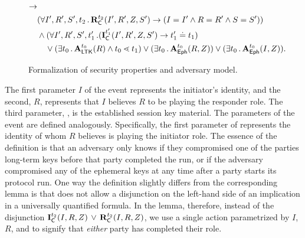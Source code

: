\begin{figure*}
\begin{align*}
    \rightarrow\\
      &(\forall I', R', S', t_2\operatorname{.} \mathbf{R}_{\textsf{C}}^{t_2}(I', R', Z, S') \rightarrow
             (I=I' \land R=R' \land S=S'))\\
      &\land (\forall I', R', S', t_1'\operatorname{.}
        (\mathbf{I}_{\textsf{C}}^{t_1'}(I', R', Z, S') \rightarrow t_1' \doteq t_1
        )\\
      &\ \ \ \lor(\exists t_0\operatorname{.} \mathbf{A}_{\textsf{LTK}}^{t_0}(R) \land t_0 \lessdot t_1)
    \lor(\exists t_0\operatorname{.} \mathbf{A}_{\textsf{Eph}}^{t_0}(R, Z))
    \lor(\exists t_0\operatorname{.} \mathbf{A}_{\textsf{Eph}}^{t_0}(I, Z)).
\end{align*}
%
\caption{Formalization of security properties and adversary model.}
\label{fig:props}
\end{figure*}

%
The first parameter $I$ of the \mIComplete{} event represents the
initiator's identity,
and the second, $R$, represents that $I$ believes $R$ to be playing
the responder role.
%
The third parameter, \mSessKey{}, is the established session key material.
%
The parameters of the \mRComplete{} event are defined analogously.
%
Specifically, the first parameter of \mRComplete{} represents the identity of
whom $R$ believes is playing the initiator role.
%
%
The essence of the definition is that an adversary only knows \mSessKey{} if they
compromised one of the
parties long-term keys before that party completed the run, or if the adversary
compromised any of the ephemeral keys at any time after a party starts
its protocol run.
%
One way the definition slightly differs from the corresponding \mTamarin{} lemma
is that \mTamarin{} does not allow a disjunction on the left-hand side of an
implication in a universally quantified formula.
%
In the lemma, therefore, instead of the disjunction
$\mathbf{I}_{\textsf{C}}^{t_2}(I, R, Z)\, \lor\,  \mathbf{R}_{\textsf{C}}^{t_2}(I, R, Z)$,
we use a single action parametrized by $I$, $R$, and \mSessKey{} to signify that
\emph{either} party has completed their role.
